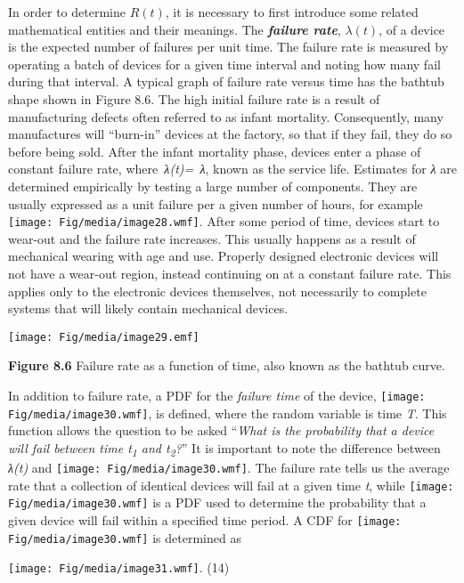 In order to determine $R(t)$, it is necessary to first introduce
some related mathematical entities and their meanings. The
\emph{\textbf{failure rate}}, $\lambda(t)$, of a device is the expected
number of failures per unit time. The failure rate is measured by
operating a batch of devices for a given time interval and noting how
many fail during that interval. A typical graph of failure rate versus
time has the bathtub shape shown in Figure 8.6. The high initial failure
rate is a result of manufacturing defects often referred to as infant
mortality. Consequently, many manufactures will ``burn-in'' devices at
the factory, so that if they fail, they do so before being sold. After
the infant mortality phase, devices enter a phase of constant failure
rate, where\emph{~λ(t)=~λ}, known as the service life. Estimates for
\emph{λ} are determined empirically by testing a large number of
components. They are usually expressed as a unit failure per a given
number of hours, for example \texttt{[image: Fig/media/image28.wmf]}.
After some period of time, devices start to wear-out and the failure
rate increases. This usually happens as a result of mechanical wearing
with age and use. Properly designed electronic devices will not have a
wear-out region, instead continuing on at a constant failure rate. This
applies only to the electronic devices themselves, not necessarily to
complete systems that will likely contain mechanical devices.

\texttt{[image: Fig/media/image29.emf]}

\textbf{Figure 8.6} Failure rate as a function of time, also known as
the bathtub curve.

In addition to failure rate, a PDF for the \emph{failure time} of the
device, \texttt{[image: Fig/media/image30.wmf]}, is defined, where the
random variable is time \emph{T}. This function allows the question to
be asked ``\emph{What is the probability that a device will fail between
time t\textsubscript{1} and t\textsubscript{2}?}'' It is important to
note the difference between \emph{λ(t)} and
\texttt{[image: Fig/media/image30.wmf]}. The failure rate tells us the
average rate that a collection of identical devices will fail at a given
time \emph{t}, while \texttt{[image: Fig/media/image30.wmf]} is a PDF
used to determine the probability that a given device will fail within a
specified time period. A CDF for \texttt{[image: Fig/media/image30.wmf]}
is determined as

\texttt{[image: Fig/media/image31.wmf]}. (14)

